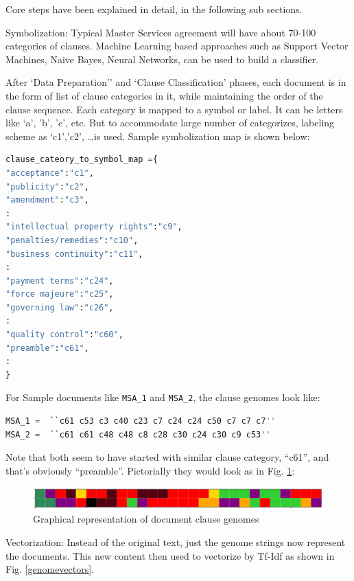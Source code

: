 \documentclass[english]{uspatent}
\begin{document}
Core steps have been explained in detail, in the following sub sections.

\patentParagraph Symbolization:
Typical Master Services agreement will have about 70-100 categories of clauses. Machine Learning based approaches such as Support Vector Machines, Naive Bayes, Neural Networks, can be used to build a classifier. 

After `Data Preparation'' and `Clause Classification' phases, each document is in the form of list of clause categories in it, while maintaining the order of the clause sequence. Each category is mapped to a symbol or label. It can be letters like `a', 'b', 'c', etc. But to accommodate large number of categorizes, labeling scheme as `c1','c2', \ldots is used. Sample symbolization map is shown below:

\begin{lstlisting}[language=Python, basicstyle=\footnotesize ]
clause_cateory_to_symbol_map ={ 
"acceptance":"c1", 
"publicity":"c2", 
"amendment":"c3", 
:
"intellectual property rights":"c9", 
"penalties/remedies":"c10", 
"business continuity":"c11", 
:
"payment terms":"c24", 
"force majeure":"c25", 
"governing law":"c26", 
:
"quality control":"c60", 
"preamble":"c61", 
:
}
\end{lstlisting}

For Sample documents like \lstinline|MSA_1| and \lstinline|MSA_2|, the clause genomes look like:
\begin{lstlisting}[language=Python, basicstyle=\footnotesize ]
MSA_1 =  ``c61 c53 c3 c40 c23 c7 c24 c24 c50 c7 c7 c7''
MSA_2 =  ``c61 c61 c48 c48 c8 c28 c30 c24 c30 c9 c53''
\end{lstlisting}

Note that both seem to have started with similar clause category, ``c61'', and that's obviously ``preamble''. Pictorially they would look as in Fig. \ref{fig:docclausegenome}:

 \begin{figure}[h!]
 \begin{center}
  \includegraphics[width=\linewidth,keepaspectratio]{img/two_genomes.png}
  \caption{Graphical representation of document clause genomes}
  \label{fig:docclausegenome}
 \end{center}
 \end{figure}

\patentParagraph Vectorization:
Instead of the original text, just the genome strings now represent the documents. This new content then used to vectorize by Tf-Idf as shown in Fig. \ref{genomevectors}.
\end{document}
